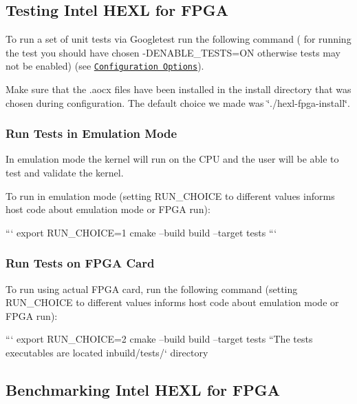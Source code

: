 \subsection*{Testing Intel H\-E\-X\-L for F\-P\-G\-A}

To run a set of unit tests via Googletest run the following command ( for running the test you should have chosen {\ttfamily -\/\-D\-E\-N\-A\-B\-L\-E\-\_\-\-T\-E\-S\-T\-S=O\-N} otherwise tests may not be enabled) (see \href{#configuration-options}{\tt Configuration Options}). \par
 Make sure that the .aocx files have been installed in the install directory that was chosen during configuration. The default choice we made was \char`\"{}./hexl-\/fpga-\/install\char`\"{}. \par


\subsubsection*{Run Tests in Emulation Mode}

In emulation mode the kernel will run on the C\-P\-U and the user will be able to test and validate the kernel. \par
 To run in emulation mode (setting R\-U\-N\-\_\-\-C\-H\-O\-I\-C\-E to different values informs host code about emulation mode or F\-P\-G\-A run)\-: \par


``` export R\-U\-N\-\_\-\-C\-H\-O\-I\-C\-E=1 cmake --build build --target tests ```

\subsubsection*{Run Tests on F\-P\-G\-A Card}

To run using actual F\-P\-G\-A card, run the following command (setting R\-U\-N\-\_\-\-C\-H\-O\-I\-C\-E to different values informs host code about emulation mode or F\-P\-G\-A run)\-: \par


``` export R\-U\-N\-\_\-\-C\-H\-O\-I\-C\-E=2 cmake --build build --target tests ``{\ttfamily  The tests executables are located in}build/tests/` directory \par


\subsection*{Benchmarking Intel H\-E\-X\-L for F\-P\-G\-A}


